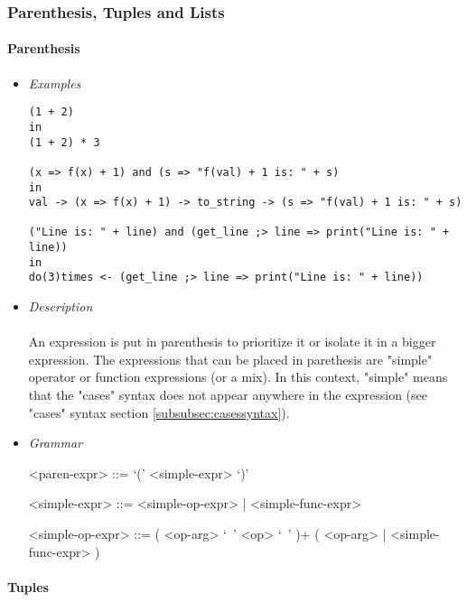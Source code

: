 \documentclass{article}
\begin{document}
\newpage
\subsubsection{Parenthesis, Tuples and Lists}

\paragraph{Parenthesis}

\begin{itemize}

\item \textit{Examples}
\begin{verbatim}
(1 + 2)
in
(1 + 2) * 3

(x => f(x) + 1) and (s => "f(val) + 1 is: " + s)
in
val -> (x => f(x) + 1) -> to_string -> (s => "f(val) + 1 is: " + s)

("Line is: " + line) and (get_line ;> line => print("Line is: " + line))
in
do(3)times <- (get_line ;> line => print("Line is: " + line))
\end{verbatim}

\item \textit{Description} \\\\
An expression is put in parenthesis to prioritize it or isolate it in a bigger
expression. The expressions that can be placed in parethesis are "simple"
operator or function expressions (or a mix). In this context, "simple" means
that the "cases" syntax does not appear anywhere in the expression (see "cases"
syntax section \ref{subsubsec:casessyntax}).

\item \textit{Grammar}
\begin{grammar}
<paren-expr> ::=  `(' <simple-expr> `)'

<simple-expr> ::= <simple-op-expr> | <simple-func-expr>

<simple-op-expr> ::=  ( <op-arg> `\ ' <op> `\ ' )+ ( <op-arg> | <simple-func-expr> )
\end{grammar}

\end{itemize}

\paragraph{Tuples}
\end{document}
